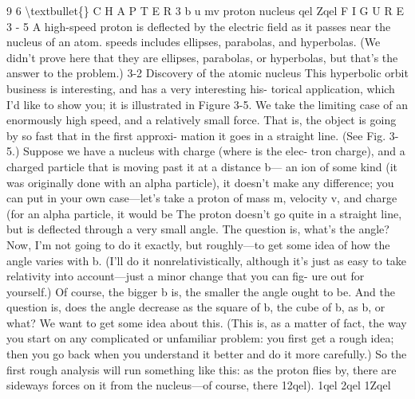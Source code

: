 \documentclass[10pt,oneside]{article}
\begin{document}
9 6 \textbackslash{}textbullet\{\} C H A P T E R  3 b u mv proton nucleus qel Zqel F I G U R E  3 - 5 A high-speed proton is deflected by the electric field as it passes near the nucleus of an atom. speeds includes ellipses, parabolas, and hyperbolas. (We didn’t prove here that they are ellipses, parabolas, or hyperbolas, but that’s the answer to the problem.) 3-2 Discovery of the atomic nucleus This hyperbolic orbit business is interesting, and has a very interesting his- torical application, which I’d like to show you; it is illustrated in Figure 3-5. We take the limiting case of an enormously high speed, and a relatively small force. That is, the object is going by so fast that in the first approxi- mation it goes in a straight line. (See Fig. 3-5.) Suppose we have a nucleus with charge (where is the elec- tron charge), and a charged particle that is moving past it at a distance b--- an ion of some kind (it was originally done with an alpha particle), it doesn’t make any difference; you can put in your own case---let’s take a proton of mass m, velocity v, and charge (for an alpha particle, it would be The proton doesn’t go quite in a straight line, but is deflected through a very small angle. The question is, what’s the angle? Now, I’m not going to do it exactly, but roughly---to get some idea of how the angle varies with b. (I’ll do it nonrelativistically, although it’s just as easy to take relativity into account---just a minor change that you can fig- ure out for yourself.) Of course, the bigger b is, the smaller the angle ought to be. And the question is, does the angle decrease as the square of b, the cube of b, as b, or what? We want to get some idea about this. (This is, as a matter of fact, the way you start on any complicated or unfamiliar problem: you first get a rough idea; then you go back when you understand it better and do it more carefully.) So the first rough analysis will run something like this: as the proton flies by, there are sideways forces on it from the nucleus---of course, there 12qel). 1qel 2qel 1Zqel\par
\end{document}
